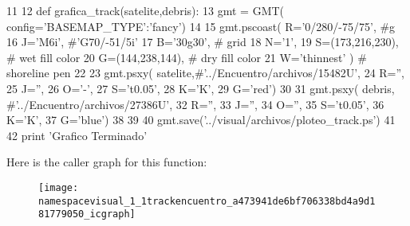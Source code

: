 \begin{DoxyCode}
11 
12 def grafica_track(satelite,debris):
13     gmt = GMT( config={'BASEMAP_TYPE':'fancy'})
14      
15     gmt.pscoast( R='0/280/-75/75', #g
16                   J='M6i', #'G70/-51/5i'
17                   B='30g30',              # grid
18                   N='1',
19                   S=(173,216,230),      # wet fill color 
20                   G=(144,238,144),      # dry fill color
21                   W='thinnest' )        # shoreline pen
22                 
23     gmt.psxy( satelite,#'../Encuentro/archivos/15482U',
24                R='',
25                J='',
26                O='-',
27                S='t0.05',
28                K='K',
29                G='red')
30                 
31     gmt.psxy( debris,  #'../Encuentro/archivos/27386U',
32                R='',
33                J='',
34                O='',
35                S='t0.05',
36                K='K',
37                G='blue')
38      
39      
40     gmt.save('../visual/archivos/ploteo_track.ps')
41      
42     print 'Grafico Terminado'
\end{DoxyCode}


\-Here is the caller graph for this function\-:\nopagebreak
\begin{figure}[H]
\begin{center}
\leavevmode
\texttt{[image: namespacevisual\_1\_1trackencuentro\_a473941de6bf706338bd4a9d181779050\_icgraph]}
\end{center}
\end{figure}


